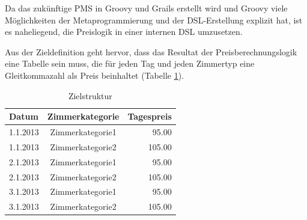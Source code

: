\documentclass[11pt,english,ngerman, headsepline]{scrreprt}
\begin{document}
Da das zukünftige PMS in Groovy und Grails erstellt wird und Groovy viele
Möglichkeiten der Metaprogrammierung und der DSL-Erstellung explizit hat, ist es
naheliegend, die Preislogik in einer internen DSL umzusetzen. 

Aus der Zieldefinition geht hervor, dass das Resultat der Preisberechnungslogik
eine Tabelle sein muss, die für jeden Tag und jeden Zimmertyp eine Gleitkommazahl als
Preis beinhaltet (Tabelle \ref{zielDefinition}).  

\begin{table}[htpb]
  \centering
  \begin{tabular}{| l | c | r |} 
 	\hline 
  	Datum & Zimmerkategorie & Tagespreis \\
  	\hline 
	1.1.2013 &  Zimmerkategorie1 &  95.00 \\
	1.1.2013 &  Zimmerkategorie2 &  105.00 \\
	2.1.2013 &  Zimmerkategorie1 &  95.00 \\
	2.1.2013 &  Zimmerkategorie2 &  105.00 \\
	3.1.2013 &  Zimmerkategorie1 &  95.00 \\
	3.1.2013 &  Zimmerkategorie2 &  105.00 \\
	\hline 
  	\end{tabular}  
 	\caption{Zielstruktur}
  \label{zielDefinition}
\end{table}	 
\end{document}
